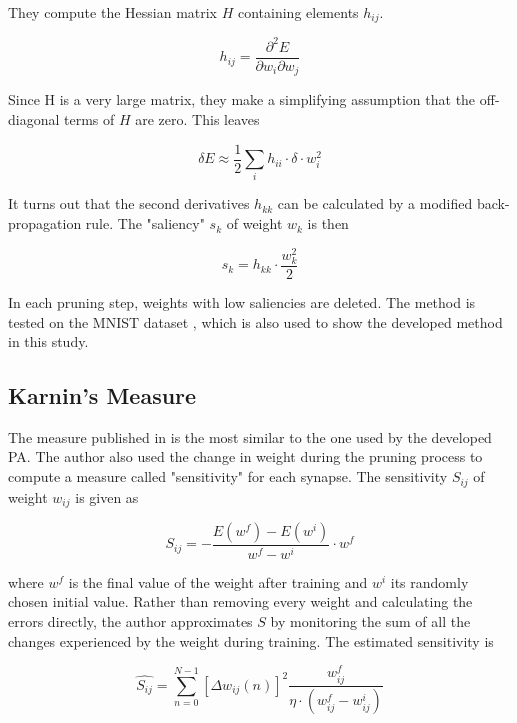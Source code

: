They compute the Hessian matrix $ H $ containing elements $ h_{ij} $.

\begin{equation}
h_{ij} = \frac{\partial^2 E}{\partial w_i \partial w_j}
\end{equation}

Since H is a very large matrix, they make a simplifying assumption that the off-diagonal terms of $ H $ are zero. This leaves

\begin{equation}
\delta E \approx \frac{1}{2} \displaystyle{\sum_i h_{ii} \cdot \delta \cdot w_i^2}
\end{equation}

It turns out that the second derivatives $ h_{kk} $ can be calculated by a modified back-propagation rule. The "saliency" $ s_k $ of weight $ w_k $ is then

\begin{equation}
s_k = h_{kk} \cdot \frac{w_k^2}{2}
\end{equation}

In each pruning step, weights with low saliencies are deleted. The method is tested on the MNIST dataset \citep{lecun:mnist}, which is also used to show the developed method in this study.

\subsection*{Karnin's Measure} \label{ssec:karnins_measure}
The measure published in \citep{karnin:pa} is the most similar to the one used by the developed PA. The author also used the change in weight during the pruning process to compute a measure called "sensitivity" for each synapse. The sensitivity $ S_{ij} $ of weight $ w_{ij} $ is given as

\begin{equation}
S_{ij} = - \frac{E(w^f) - E(w^i)}{w^f - w^i} \cdot w^f
\end{equation}

where $ w^f $ is the final value of the weight after training and $ w^i $ its randomly chosen initial value. Rather than removing every weight and calculating the errors directly, the author approximates $ S $ by monitoring the sum of all the changes experienced by the weight during training. The estimated sensitivity is

\begin{equation}
\hat{S_{ij}} = \displaystyle{\sum_{n=0}^{N-1} \left[\Delta w_{ij} (n)\right]^2 \frac{w_{ij}^f}{\eta \cdot (w_{ij}^f - w_{ij}^i)}}
\end{equation}

